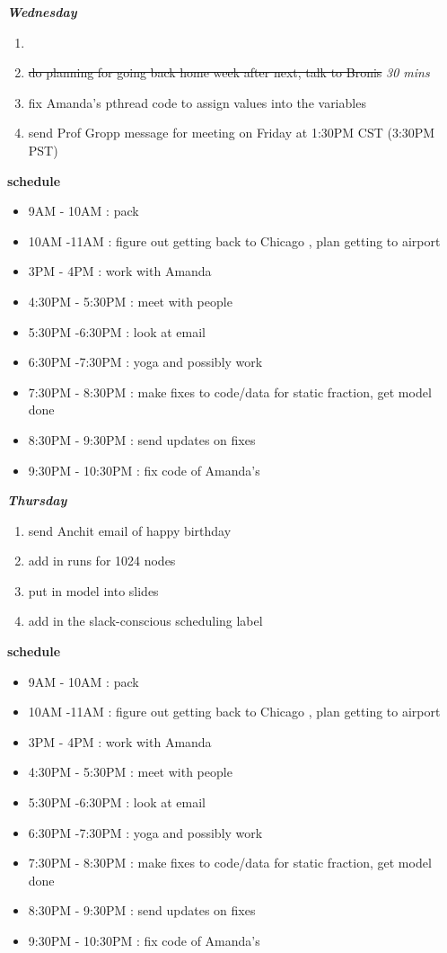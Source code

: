 \documentclass[11pt]{article}
\newcommand{\doneTask}[1]{\item \sout{#1}}
\newcommand{\timeEst}[1]{\textit{#1}}
\begin{document}
\textbf{\textit{Wednesday}}
\begin{enumerate}
\item
\doneTask{do planning for going back home week after next, talk to Bronis} \timeEst{30 mins}
\item fix Amanda's pthread code to assign values into the variables
\item send Prof Gropp message for meeting on Friday at 1:30PM CST (3:30PM PST)

\end{enumerate}



\textbf{schedule}
\begin{itemize}
\item 9AM - 10AM :  pack
\item 10AM -11AM : figure out getting back to Chicago ,  plan getting to airport

\item 3PM - 4PM : work with Amanda
\item 4:30PM - 5:30PM :  meet with people
\item 5:30PM -6:30PM :  look at email
\item 6:30PM -7:30PM :  yoga and possibly work
\item 7:30PM - 8:30PM : make fixes to code/data for static fraction,  get model done
\item 8:30PM - 9:30PM : send updates on fixes
\item 9:30PM - 10:30PM : fix code of Amanda's
\end{itemize}

\textbf{\textit{Thursday}}
\begin{enumerate}
\item send Anchit email of happy birthday

\item add in runs for 1024 nodes
\item put in model into slides
\item add in the slack-conscious scheduling label
\end{enumerate}


\textbf{schedule}
\begin{itemize}
\item 9AM - 10AM :  pack
\item 10AM -11AM : figure out getting back to Chicago ,  plan getting to airport

\item 3PM - 4PM : work with Amanda
\item 4:30PM - 5:30PM :  meet with people
\item 5:30PM -6:30PM :  look at email
\item 6:30PM -7:30PM :  yoga and possibly work
\item 7:30PM - 8:30PM : make fixes to code/data for static fraction,  get model done
\item 8:30PM - 9:30PM : send updates on fixes
\item 9:30PM - 10:30PM : fix code of Amanda's
\end{itemize}
\end{document}
